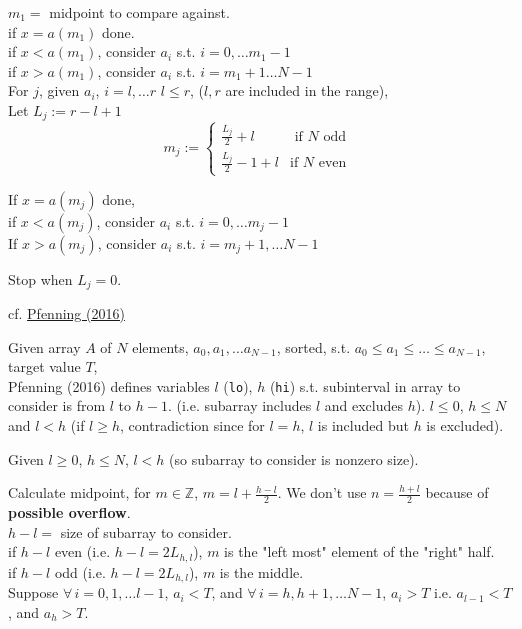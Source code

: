 \documentclass[10pt]{amsart}
\begin{document}
$m_1=$ midpoint to compare against. \\

if $x=a(m_1)$ done. \\
if $x< a(m_1)$, consider $a_i$ s.t. $i=0, \dots m_1-1$ \\
if $x>a(m_1)$, consider $a_i$ s.t. $i=m_1+1 \dots N-1$ \\

For $j$, given $a_i$, $i=l, \dots r$ $l\leq r$, ($l, r$ are included in the range), \\
Let $L_j := r - l +1$ \\
\[
m_j := \begin{cases} \frac{L_j}{2} + l & \text{ if $N$ odd } \\
\frac{L_j}{2} - 1 + l & \text{if $N$ even } \end{cases} 
\]

If $x=a(m_j)$ done, \\
if $x<a(m_j)$, consider $a_i$ s.t. $i=0,\dots m_j -1$ \\
If $x> a(m_j)$, consider $a_i$ s.t. $i=m_j+1, \dots N-1$ 

Stop when $L_j=0$.

cf. \href{https://web2.qatar.cmu.edu/~mhhammou/15122-s16/lectures/06-binsearch.pdf}{Pfenning (2016)}

Given array $A$ of $N$ elements, $a_0, a_1, \dots a_{N-1}$, sorted, s.t. $a_0 \leq a_1 \leq \dots \leq a_{N-1}$, target value $T$, \\
Pfenning (2016) defines variables $l$ (\texttt{lo}), $h$ (\texttt{hi}) s.t. subinterval in array to consider is from $l$ to $h-1$. (i.e. subarray includes $l$ and excludes $h$). $l\leq 0 $, $h\leq N$ and $l <h$ (if $l\geq h$, contradiction since for $l=h$, $l$ is included but $h$ is excluded).

Given $l\geq 0$, $h\leq N$, $l<h$ (so subarray to consider is nonzero size).

Calculate midpoint, for $m\in \mathbb{Z}$, $m = l + \frac{h-l}{2}$.  We don't use $n = \frac{h+l}{2}$ because of \textbf{possible overflow}. \\

$h-l =$ size of subarray to consider. \\
if $h-l$ even (i.e. $h-l = 2L_{h,l}$), $m$ is the "left most" element of the "right" half. \\
if $h-l$ odd (i.e. $h-l = 2L_{h,l}$), $m$ is the middle. \\

Suppose $\forall \, i = 0, 1, \dots l -1$, $a_i <T$, and $\forall \, i = h, h+1, \dots N-1$, $a_i >T$ i.e. $a_{l-1} < T$, and $a_h > T$. 
\end{document}

